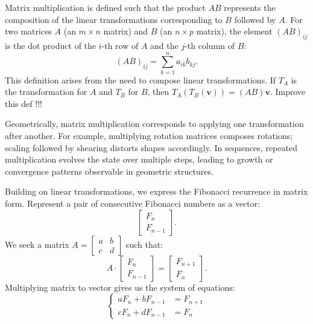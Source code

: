 \documentclass{article}
\begin{document}
Matrix multiplication is defined such that the product \( AB \) represents the composition of the linear transformations corresponding to \( B \) followed by \( A \). For two matrices \( A \) (an \( m \times n \) matrix) and \( B \) (an \( n \times p \) matrix), the element \( (AB)_{ij} \) is the dot product of the \( i \)-th row of \( A \) and the \( j \)-th column of \( B \):
\[
(AB)_{ij} = \sum_{k=1}^n a_{ik} b_{kj}.
\]
This definition arises from the need to compose linear transformations. If \( T_A \) is the transformation for \( A \) and \( T_B \) for \( B \), then \( T_A(T_B(\mathbf{v})) = (AB) \mathbf{v} \).
Improve this def !!!

Geometrically, matrix multiplication corresponds to applying one transformation after another. For example, multiplying rotation matrices composes rotations; scaling followed by shearing distorts shapes accordingly. In sequences, repeated multiplication evolves the state over multiple steps, leading to growth or convergence patterns observable in geometric structures.

Building on linear transformations, we express the Fibonacci recurrence in matrix form. Represent a pair of consecutive Fibonacci numbers as a vector:
\[
\begin{bmatrix} F_n \\ F_{n-1} \end{bmatrix}.
\]
We seek a matrix \( A = \begin{bmatrix} a & b \\ c & d \end{bmatrix} \) such that:
\[
A \cdot \begin{bmatrix} F_n \\ F_{n-1} \end{bmatrix} = \begin{bmatrix} F_{n+1} \\ F_n \end{bmatrix}.
\]
Multiplying matrix to vector gives us the system of equations:
\begin{equation}
	\left\{
	\begin{aligned}
		a F_n + b F_{n-1} &= F_{n+1}\\
		c F_n + d F_{n-1} &= F_n
	\end{aligned}
	\right.
	\label{sys_fib}
\end{equation}
\end{document}
